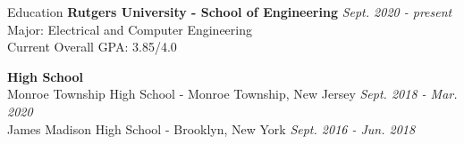\documentclass{resume}
\begin{document}

    \begin{rSection}{Education}
        {\bf Rutgers University - School of Engineering} \hfill {\em Sept. 2020 - present} \\
        Major: Electrical and Computer Engineering \\
        Current Overall GPA: 3.85/4.0

        {\bf High School}  \\
        Monroe Township High School - Monroe Township, New Jersey \hfill {\em Sept. 2018 - Mar. 2020} \\
        James Madison High School - Brooklyn, New York \hfill {\em Sept. 2016 - Jun. 2018}
    \end{rSection}

\end{document}

